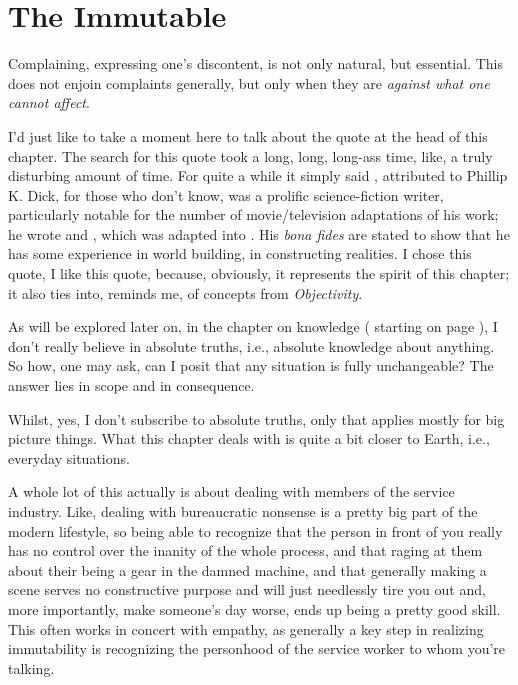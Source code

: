 \documentclass[../butidigress.tex]{subfiles}
\begin{document}
\chapter{The Immutable}\label{chap:immutable}
\newpage
{}
Complaining, expressing one's discontent, is not only natural, but essential.
This does not enjoin complaints generally, but only when they are \emph{against what one cannot affect}.

I'd just like to take a moment here to talk about the quote at the head of this chapter.
The search for this quote took a long, long, long-ass time, like, a truly disturbing amount of time.
For quite a while it simply said , attributed to 
Phillip K. Dick, for those who don't know, was a prolific science-fiction writer, particularly notable for the number of movie/television adaptations of his work; he wrote  and , which was adapted into .
His \textit{bona fides} are stated to show that he has some experience in world building, in constructing realities.
I chose this quote, I like this quote, because, obviously, it represents the spirit of this chapter; it also ties into, reminds me, of concepts from \textit{Objectivity}.

As will be explored later on, in the chapter on knowledge ( starting on page \pageref{chap:knowledge}), I don't really believe in absolute truths, i.e., absolute knowledge about anything.
So how, one may ask, can I posit that any situation is fully unchangeable?
The answer lies in scope and in consequence.

Whilst, yes, I don't subscribe to absolute truths, only  that applies mostly for big picture things.
What this chapter deals with is quite a bit closer to Earth, i.e., everyday situations.

A whole lot of this actually is about dealing with members of the service industry.
Like, dealing with bureaucratic nonsense is a pretty big part of the modern lifestyle, so being able to recognize that the person in front of you really has no control over the inanity of the whole process, and that raging at them about their being a gear in the damned machine, and that generally making a scene serves no constructive purpose and will just needlessly tire you out and, more importantly, make someone's day worse, ends up being a pretty good skill.
This often works in concert with empathy, as generally a key step in realizing immutability is recognizing the personhood of the service worker to whom you're talking.
\end{document}
